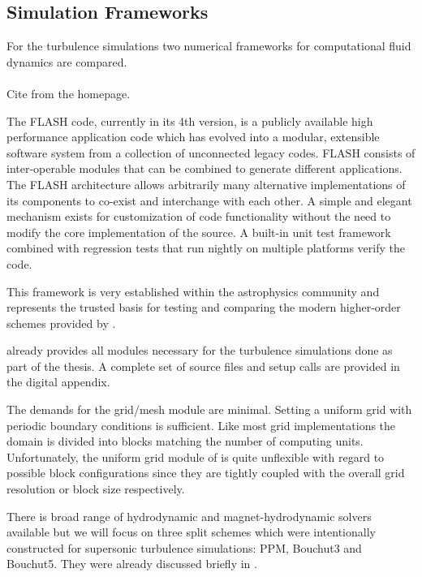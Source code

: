 \subsection{Simulation Frameworks}

For the turbulence simulations two numerical frameworks for computational fluid
dynamics are compared.

\paragraph{\FLASH}
Cite from the homepage.

The FLASH code, currently in its 4th version, is a publicly available high
performance application code which has evolved into a modular, extensible
software system from a collection of unconnected legacy codes. FLASH consists
of inter-operable modules that can be combined to generate different
applications. The FLASH architecture allows arbitrarily many alternative
implementations of its components to co-exist and interchange with each other.
A simple and elegant mechanism exists for customization of code functionality
without the need to modify the core implementation of the source. A built-in
unit test framework combined with regression tests that run nightly on multiple
platforms verify the code. 

This framework is very established within the astrophysics community and
represents the trusted basis for testing and comparing the modern higher-order
schemes provided by \FLEXI.

\FLASH already provides all modules necessary for the turbulence simulations
done as part of the thesis. A complete set of source files and setup calls
are provided in the digital appendix.

The demands for the grid/mesh module are minimal. Setting a uniform grid with
periodic boundary conditions is sufficient. Like most grid implementations the
domain is divided into blocks matching the number of computing units.
Unfortunately, the uniform grid module of \FLASH is quite unflexible with
regard to possible block configurations since they are tightly coupled with the
overall grid resolution or block size respectively.

There is broad range of hydrodynamic and magnet-hydrodynamic solvers available
but we will focus on three split schemes which were intentionally constructed
for supersonic turbulence simulations: PPM, Bouchut3 and Bouchut5. They
were already discussed briefly in .

